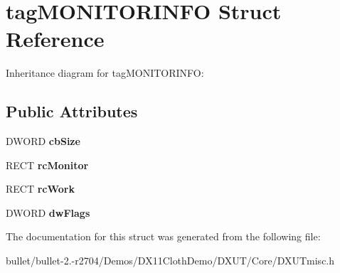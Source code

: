 \hypertarget{structtag_m_o_n_i_t_o_r_i_n_f_o}{\section{tag\+M\+O\+N\+I\+T\+O\+R\+I\+N\+F\+O Struct Reference}
\label{structtag_m_o_n_i_t_o_r_i_n_f_o}
}


Inheritance diagram for tag\+M\+O\+N\+I\+T\+O\+R\+I\+N\+F\+O\+:
\subsection*{Public Attributes}
\begin{DoxyCompactItemize}
\item 
\hypertarget{structtag_m_o_n_i_t_o_r_i_n_f_o_ae33bcbe159b7f7f4917c0949287acaba}{D\+W\+O\+R\+D {\bfseries cb\+Size}}\label{structtag_m_o_n_i_t_o_r_i_n_f_o_ae33bcbe159b7f7f4917c0949287acaba}

\item 
\hypertarget{structtag_m_o_n_i_t_o_r_i_n_f_o_a3e7136198a3c55f18014f6b8cc78e37c}{R\+E\+C\+T {\bfseries rc\+Monitor}}\label{structtag_m_o_n_i_t_o_r_i_n_f_o_a3e7136198a3c55f18014f6b8cc78e37c}

\item 
\hypertarget{structtag_m_o_n_i_t_o_r_i_n_f_o_a6b69929d40dcc1715001f2f3140130a5}{R\+E\+C\+T {\bfseries rc\+Work}}\label{structtag_m_o_n_i_t_o_r_i_n_f_o_a6b69929d40dcc1715001f2f3140130a5}

\item 
\hypertarget{structtag_m_o_n_i_t_o_r_i_n_f_o_a7f7a1608179d7bf5b75abc2152fe04de}{D\+W\+O\+R\+D {\bfseries dw\+Flags}}\label{structtag_m_o_n_i_t_o_r_i_n_f_o_a7f7a1608179d7bf5b75abc2152fe04de}

\end{DoxyCompactItemize}


The documentation for this struct was generated from the following file\+:\begin{DoxyCompactItemize}
\item 
bullet/bullet-\/2.-\/r2704/\+Demos/\+D\+X11\+Cloth\+Demo/\+D\+X\+U\+T/\+Core/D\+X\+U\+Tmisc.\+h\end{DoxyCompactItemize}
